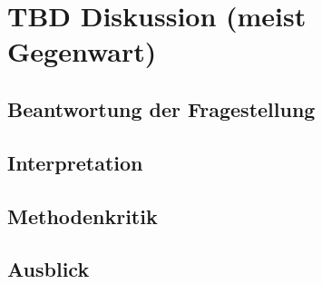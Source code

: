 %
%
\glsresetall
\let\raggedsection\centering
\chapter{TBD Diskussion (meist Gegenwart)}
\let\raggedsection\raggedright 
\section{Beantwortung der Fragestellung}\label{section.diskussion.fragestellung}
\section{Interpretation}\label{section.diskussion.interpretation}
\section{Methodenkritik}\label{section.diskussion.methodenkritik}
\section{Ausblick}\label{section.diskussion.ausblick}


